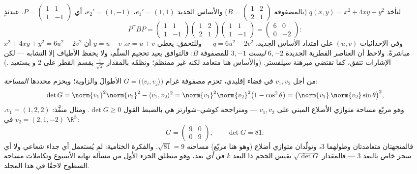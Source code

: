 \begin{example}\label{ex:b2:quadratic:congruence}
لنأخذ $q(x, y) = x^2 + 4xy + y^2$ (بالمصفوفة $B = \begin{pmatrix} 1
& 2\\ 2 & 1\end{pmatrix}$) والأساس الجديد $e_1' = (1, 1)$،
$e_2' = (1, -1)$، أي $P = \begin{pmatrix} 1 & 1\\ 1 &
-1\end{pmatrix}$. عندئذٍ
\[
P^{\mathsf T}BP
= \begin{pmatrix} 1 & 1\\ 1 & -1\end{pmatrix}
\begin{pmatrix} 1 & 2\\ 2 & 1\end{pmatrix}
\begin{pmatrix} 1 & 1\\ 1 & -1\end{pmatrix}
= \begin{pmatrix} 6 & 0\\ 0 & -2\end{pmatrix} :
\]
وفي الإحداثيات $(u, v)$ على امتداد الأساس الجديد، $q = 6u^2 -
2v^2$ --- وللتحقق: يعطي $x = u + v$، $y = u - v$ أن $x^2 + 4xy +
y^2 = 6u^2 - 2v^2$ مباشرةً. ولاحظ أن العناصر القطرية الجديدة $6,
-2$ \emph{ليست}  $3, -1$ للمصفوفة $B$: فالتوافق
يعيد تحجيم السلّم، ولا يحفظ الأطياف إلا التشابه --- لكن الإشارات
تتفق، كما تقتضي مبرهنة سيلفستر. (والأساس هنا
متعامد لكنه غير ممنظم؛ ونظمُه بالمقدار
$\frac{1}{\sqrt2}$ يقسم القطر على $2$ و
يستعيد .)
\end{example}

\begin{example}\label{ex:b2:quadratic:gramarea}
من أجل $v_1, v_2$ في فضاء إقليدي، تحزم مصفوفة غرام $G =
\bigl(\langle v_i, v_j\rangle\bigr)$ الأطوالَ
والزاوية؛ ويحزم محددها \emph{المساحة}:
\[
\det G = \norm{v_1}^2\norm{v_2}^2 - \langle v_1, v_2\rangle^2
= \norm{v_1}^2\norm{v_2}^2\bigl(1 - \cos^2\theta\bigr)
= \bigl(\norm{v_1}\,\norm{v_2}\sin\theta\bigr)^2 ,
\]
وهو مربّع مساحة متوازي الأضلاع المبني على $v_1, v_2$ ---
ومتراجحة كوشي--شوارتز هي بالضبط القول $\det G \geq 0$.
ومثال منفَّذ: $v_1 = (1, 2, 2)$، $v_2 = (2, 1, -2)$ في
$\R^3$:
\[
G = \begin{pmatrix} 9 & 0\\ 0 & 9 \end{pmatrix},
\qquad
\det G = 81 :
\]
فالمتجهتان متعامدتان وطولهما $3$، وتولّدان
متوازي أضلاع (وهو هنا مربّع) مساحته $\sqrt{81} = 9$.
والفكرة الختامية: لم يُستعمل أي جداء شعاعي ولا أي سحر خاص بالبعد
$3$ --- فالمقدار $\sqrt{\det G}$ يقيس الحجم ذا البعد $k$
في \emph{أي} بعد، وهو منطلق الجزء الأول من مسألة نهاية
الأسبوع وتكاملات مساحة السطوح لاحقًا في
هذا المجلد.
\end{example}

